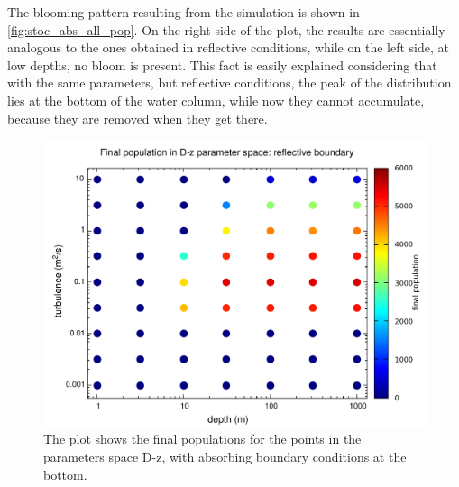 %
%
%

The blooming pattern resulting from the simulation is shown in \autoref{fig:stoc_abs_all_pop}. On the right side of the plot, the results are essentially analogous to the ones obtained in reflective conditions, while on the left side, at low depths, no bloom is present. This fact is easily explained considering that with the same parameters, but reflective conditions, the peak of the distribution lies at the bottom of the water column, while now they cannot accumulate, because they are removed when they get there.

\begin{figure} 
  \includegraphics[width=\textwidth]{data/1D_model/absorbing_bottom/bloom_pop}
  \caption{The plot shows the final populations for the points in the parameters space D-z, with absorbing boundary conditions at the bottom.}
  \label{fig:stoc_abs_all_pop}
\end{figure}

